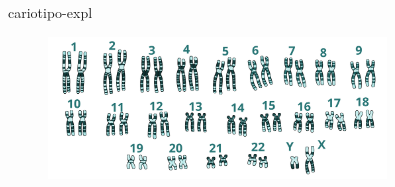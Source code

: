 \documentclass[preview]{standalone}
\begin{document}
\begin{snippet}{cariotipo-expl}
    \begin{center}
    \begin{figure}[ht]
        \centering
        \includegraphics[width=0.8\textwidth]{./resources/cariotipo}
    \end{figure}
    \end{center}
\end{snippet}
\end{document}
